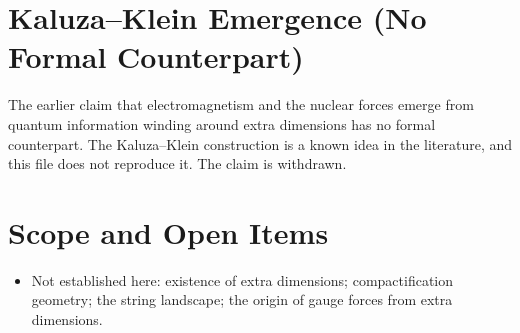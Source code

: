 \documentclass[11pt, a4paper]{article}
\begin{document}
\section{Kaluza--Klein Emergence (No Formal Counterpart)}
The earlier claim that electromagnetism and the nuclear forces emerge from quantum information winding around extra dimensions has no formal counterpart. The Kaluza--Klein construction is a known idea in the literature, and this file does not reproduce it. The claim is withdrawn.

\section{Scope and Open Items}
\begin{itemize}
  \item Not established here: existence of extra dimensions; compactification geometry; the string landscape; the origin of gauge forces from extra dimensions.
\end{itemize}
\end{document}
